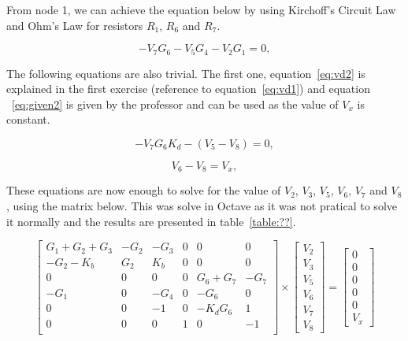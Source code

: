 From node 1, we can achieve the equation below by using Kirchoff's Circuit Law and Ohm's Law for resistors $R_1$, $R_6$ and $R_7$.

\begin{equation}
  -V_{7}G_{6} - V_{5}G_{4} - V_{2}G_{1} = 0,
  \label{eq:node21}
\end{equation}


The following equations are also trivial. The first one, equation~\ref{eq:vd2} is explained in the first exercise (reference to equation~\ref{eq:vd1}) and equation ~\ref{eq:given2} is given by the professor and can be used as the value of $V_x$ is constant.

\begin{equation}
  -V_{7}G_{6}K_{d} - (V_{5} - V_{8}) = 0,
  \label{eq:vd2}
\end{equation}


\begin{equation}
  V_{6} - V_{8} = V_{x},
  \label{eq:given2}
\end{equation}

These equations are now enough to solve for the value of $V_2$, $V_3$, $V_5$, $V_6$, $V_7$ and $V_8$, using the matrix below. This was solve in Octave as it was not pratical to solve it normally and the results are presented in table~\ref{table:??}.

\begin{equation}
\left[ \begin{array}{cccccc} 
		G_1+G_2+G_3 & -G_2 & -G_3 & 0 & 0 & 0 \\
		-G_2-K_b & G_2 & K_b & 0 & 0 & 0 \\ 
		0 & 0 & 0 & 0 & G_6+G_7 & -G_7  \\ 
		-G_1 & 0 & -G_4 & 0 & -G_6 & 0  \\ 
		0 & 0 & -1 & 0 & -K_dG_6 & 1 \\ 
		0 & 0 & 0 & 1 & 0 & -1 \\ 
\end{array} \right]
\times \left[ \begin{array}{c} V_2 \\ V_3 \\  V_5 \\ V_6 \\ V_7 \\ V_8 \end{array} \right] =
\left[ \begin{array}{c} 0 \\ 0 \\ 0 \\ 0 \\ 0 \\ V_x  \end{array} \right]
\label{eq:nodalmatrix2}
\end{equation}

